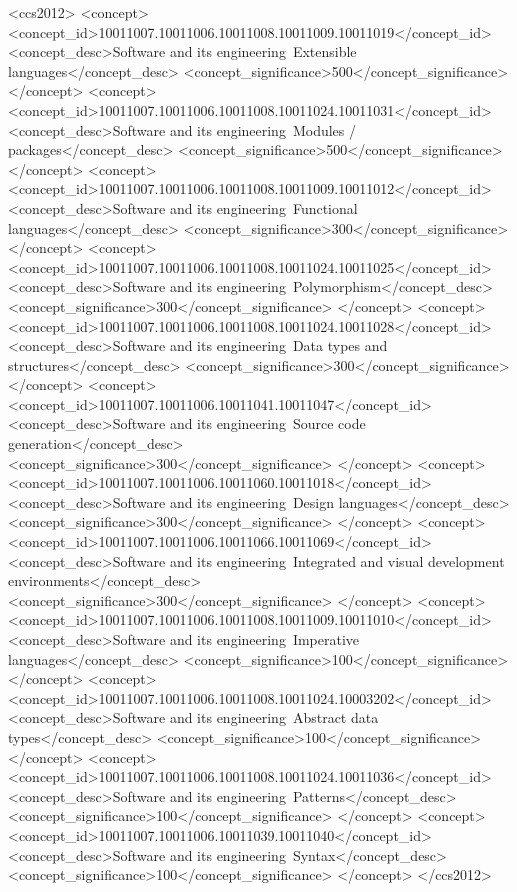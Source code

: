 \documentclass[sigplan,screen]{acmart}
\begin{document}

\begin{CCSXML}
<ccs2012>
<concept>
<concept_id>10011007.10011006.10011008.10011009.10011019</concept_id>
<concept_desc>Software and its engineering~Extensible languages</concept_desc>
<concept_significance>500</concept_significance>
</concept>
<concept>
<concept_id>10011007.10011006.10011008.10011024.10011031</concept_id>
<concept_desc>Software and its engineering~Modules / packages</concept_desc>
<concept_significance>500</concept_significance>
</concept>
<concept>
<concept_id>10011007.10011006.10011008.10011009.10011012</concept_id>
<concept_desc>Software and its engineering~Functional languages</concept_desc>
<concept_significance>300</concept_significance>
</concept>
<concept>
<concept_id>10011007.10011006.10011008.10011024.10011025</concept_id>
<concept_desc>Software and its engineering~Polymorphism</concept_desc>
<concept_significance>300</concept_significance>
</concept>
<concept>
<concept_id>10011007.10011006.10011008.10011024.10011028</concept_id>
<concept_desc>Software and its engineering~Data types and structures</concept_desc>
<concept_significance>300</concept_significance>
</concept>
<concept>
<concept_id>10011007.10011006.10011041.10011047</concept_id>
<concept_desc>Software and its engineering~Source code generation</concept_desc>
<concept_significance>300</concept_significance>
</concept>
<concept>
<concept_id>10011007.10011006.10011060.10011018</concept_id>
<concept_desc>Software and its engineering~Design languages</concept_desc>
<concept_significance>300</concept_significance>
</concept>
<concept>
<concept_id>10011007.10011006.10011066.10011069</concept_id>
<concept_desc>Software and its engineering~Integrated and visual development environments</concept_desc>
<concept_significance>300</concept_significance>
</concept>
<concept>
<concept_id>10011007.10011006.10011008.10011009.10011010</concept_id>
<concept_desc>Software and its engineering~Imperative languages</concept_desc>
<concept_significance>100</concept_significance>
</concept>
<concept>
<concept_id>10011007.10011006.10011008.10011024.10003202</concept_id>
<concept_desc>Software and its engineering~Abstract data types</concept_desc>
<concept_significance>100</concept_significance>
</concept>
<concept>
<concept_id>10011007.10011006.10011008.10011024.10011036</concept_id>
<concept_desc>Software and its engineering~Patterns</concept_desc>
<concept_significance>100</concept_significance>
</concept>
<concept>
<concept_id>10011007.10011006.10011039.10011040</concept_id>
<concept_desc>Software and its engineering~Syntax</concept_desc>
<concept_significance>100</concept_significance>
</concept>
</ccs2012>
\end{CCSXML}
\end{document}
